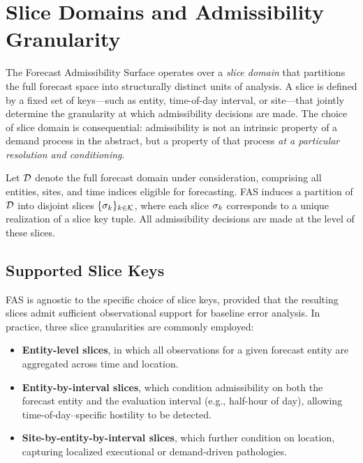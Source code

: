 
\section{Slice Domains and Admissibility Granularity}
\label{sec:fas_slice_domains}

The Forecast Admissibility Surface operates over a \emph{slice domain} that
partitions the full forecast space into structurally distinct units of analysis.
A slice is defined by a fixed set of keys—such as entity, time-of-day interval, or
site—that jointly determine the granularity at which admissibility decisions are
made. The choice of slice domain is consequential: admissibility is not an
intrinsic property of a demand process in the abstract, but a property of that
process \emph{at a particular resolution and conditioning}.

Let $\mathcal{D}$ denote the full forecast domain under consideration, comprising all
entities, sites, and time indices eligible for forecasting. FAS induces a
partition of $\mathcal{D}$ into disjoint slices
$\{\sigma_k\}_{k \in \mathcal{K}}$, where each slice $\sigma_k$ corresponds to a
unique realization of a slice key tuple. All admissibility decisions are made at
the level of these slices.

\subsection{Supported Slice Keys}

FAS is agnostic to the specific choice of slice keys, provided that the resulting
slices admit sufficient observational support for baseline error analysis. In
practice, three slice granularities are commonly employed:

\begin{itemize}
  \item \textbf{Entity-level slices}, in which all observations for a given
        forecast entity are aggregated across time and location.
  \item \textbf{Entity-by-interval slices}, which condition admissibility on both
        the forecast entity and the evaluation interval (e.g., half-hour of day),
        allowing time-of-day–specific hostility to be detected.
  \item \textbf{Site-by-entity-by-interval slices}, which further condition on
        location, capturing localized executional or demand-driven pathologies.
\end{itemize}

